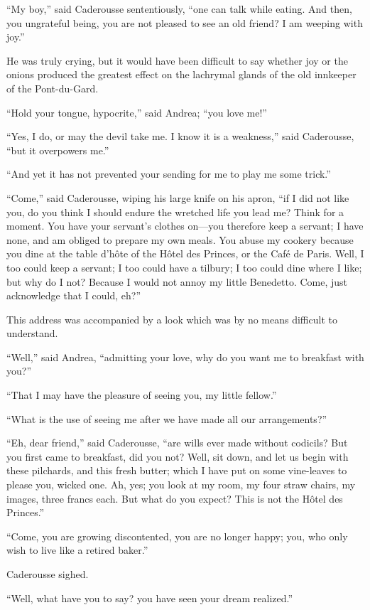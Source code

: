 “My boy,” said Caderousse sententiously, “one can talk while eating.
And then, you ungrateful being, you are not pleased to see an old
friend? I am weeping with joy.”

He was truly crying, but it would have been difficult to say whether
joy or the onions produced the greatest effect on the lachrymal glands
of the old innkeeper of the Pont-du-Gard.

“Hold your tongue, hypocrite,” said Andrea; “you love me!”

“Yes, I do, or may the devil take me. I know it is a weakness,” said
Caderousse, “but it overpowers me.”

“And yet it has not prevented your sending for me to play me some
trick.”

“Come,” said Caderousse, wiping his large knife on his apron, “if I did
not like you, do you think I should endure the wretched life you lead
me? Think for a moment. You have your servant’s clothes on—you
therefore keep a servant; I have none, and am obliged to prepare my own
meals. You abuse my cookery because you dine at the table d’hôte of the
Hôtel des Princes, or the Café de Paris. Well, I too could keep a
servant; I too could have a tilbury; I too could dine where I like; but
why do I not? Because I would not annoy my little Benedetto. Come, just
acknowledge that I could, eh?”

This address was accompanied by a look which was by no means difficult
to understand.

“Well,” said Andrea, “admitting your love, why do you want me to
breakfast with you?”

“That I may have the pleasure of seeing you, my little fellow.”

“What is the use of seeing me after we have made all our arrangements?”

“Eh, dear friend,” said Caderousse, “are wills ever made without
codicils? But you first came to breakfast, did you not? Well, sit down,
and let us begin with these pilchards, and this fresh butter; which I
have put on some vine-leaves to please you, wicked one. Ah, yes; you
look at my room, my four straw chairs, my images, three francs each.
But what do you expect? This is not the Hôtel des Princes.”

“Come, you are growing discontented, you are no longer happy; you, who
only wish to live like a retired baker.”

Caderousse sighed.

“Well, what have you to say? you have seen your dream realized.”

